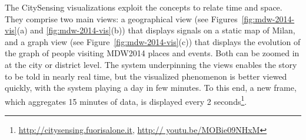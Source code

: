 

The CitySensing visualizations exploit the \frappe{} concepts to relate time and space.
They comprise two main views: a geographical view (see Figures~\ref{fig:mdw-2014-vis}(a) and \ref{fig:mdw-2014-vis}(b)) that displays signals on a static map of Milan, and a graph view (see Figure~\ref{fig:mdw-2014-vis}(c)) that displays the evolution of the graph of people visiting MDW2014 places and events. Both can be zoomed in at the city or district level. The system underpinning the views enables the story to be told in nearly real time, but the visualized phenomenon is better viewed quickly, with the system playing a day in few minutes. To this end, a new frame, which aggregates 15 minutes of data, is displayed every 2 seconds\footnote{\url{http://citysensing.fuorisalone.it}, \url{http:// youtu.be/MOBie09NHxM}}.

